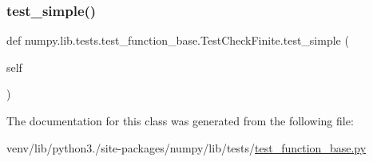 \mbox{\label{classnumpy_1_1lib_1_1tests_1_1test__function__base_1_1TestCheckFinite_ad4af6b1023e07cdf729080ad6523e079}} 
\subsubsection{\texorpdfstring{test\+\_\+simple()}{test\_simple()}}
{\footnotesize\ttfamily def numpy.\+lib.\+tests.\+test\+\_\+function\+\_\+base.\+Test\+Check\+Finite.\+test\+\_\+simple (\begin{DoxyParamCaption}\item[{}]{self }\end{DoxyParamCaption})}



The documentation for this class was generated from the following file\+:\begin{DoxyCompactItemize}
\item 
venv/lib/python3./site-\/packages/numpy/lib/tests/\hyperlink{lib_2tests_2test__function__base_8py}{test\+\_\+function\+\_\+base.\+py}\end{DoxyCompactItemize}
